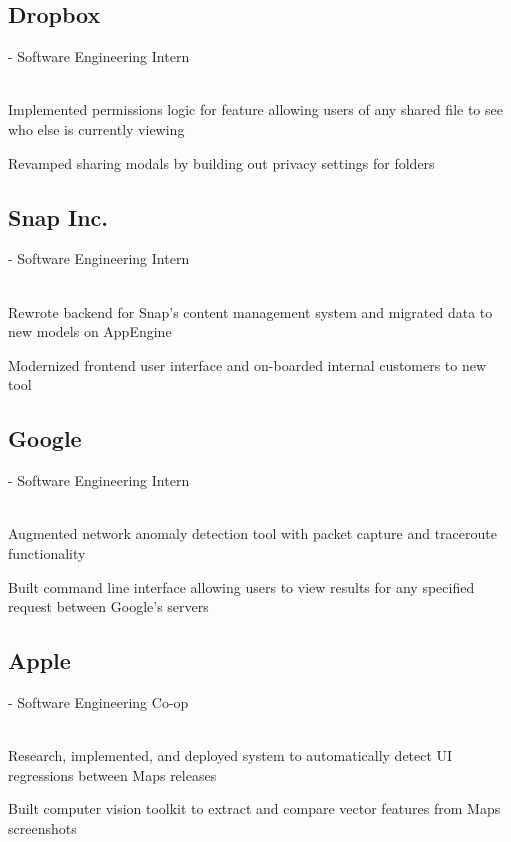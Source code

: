 \documentclass{resume}
\begin{document}
\subsection{Dropbox}- Software Engineering Intern \\
\\
\begin{tightemize}
	\item Implemented permissions logic for feature allowing users of any shared file to see who else is currently viewing
	\item Revamped sharing modals by building out privacy settings for folders
\end{tightemize}

\subsection{Snap Inc.}- Software Engineering Intern \\
\\
\begin{tightemize}
	\item Rewrote backend for Snap's content management system and migrated data to new models on AppEngine
	\item Modernized frontend user interface and on-boarded internal customers to new tool
\end{tightemize}

\subsection{Google}- Software Engineering Intern \\
\\
\begin{tightemize}
	\item Augmented network anomaly detection tool with packet capture and traceroute functionality
	\item Built command line interface allowing users to view results for any specified request between Google's servers
\end{tightemize}

\subsection{Apple}- Software Engineering Co-op \\
\\
\begin{tightemize}
	\item Research, implemented, and deployed system to automatically detect UI regressions between Maps releases
	\item Built computer vision toolkit to extract and compare vector features from Maps screenshots
\end{tightemize}
\end{document}
